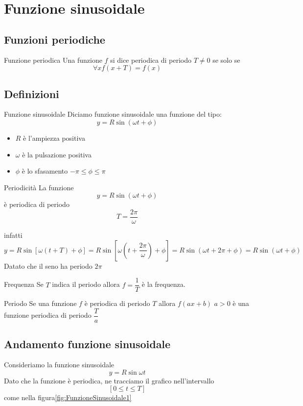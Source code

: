 \chapter{Funzione sinusoidale}
\label{cha:FunzioneSinusoidale}
\section{Funzioni periodiche}
\begin{definizionet}{Funzione periodica}{}
Una funzione $f$ si dice periodica di periodo $T\neq0$ se solo se \[\forall x f(x+T)=f(x)\]
\end{definizionet}
\section{Definizioni}

\begin{definizionet}{Funzione sinusoidale}{}
	Diciamo funzione sinusoidale una funzione del tipo:
	\[ y=R\sin(\omega t+\phi)\]
	\begin{itemize}
		\item $R$ è l'ampiezza positiva
		\item $\omega$ è la pulsazione positiva
		\item $\phi$ è lo sfasamento $-\pi\leq\phi\leq\pi$
	\end{itemize}
\end{definizionet}
\begin{osservazionet}{Periodicità}{}
	La funzione\[ y=R\sin(\omega t+\phi)\]è periodica di periodo\[T=\dfrac{2\pi}{\omega}\]
\end{osservazionet}
infatti\[ y=R\sin[\omega(t+T)+\phi]=R\sin[\omega(t+\dfrac{2\pi}{\omega})+\phi]=R\sin(\omega
t+2\pi+\phi)=R\sin(\omega
t+\phi)\]
Datato che il seno ha periodo $2\pi$
\begin{definizionet}{Frequenza}{}
	Se $T$ indica il periodo allora  $f=\dfrac{1}{T}$ è la frequenza.
\end{definizionet}
\begin{teoremat}{Periodo}{}
	Se una funzione $f$ è periodica di periodo $T$ allora $f(ax+b)$ $a>0$ è una funzione periodica di periodo $\dfrac{T}{a}$
\end{teoremat}
\section{Andamento funzione sinusoidale}
Consideriamo la funzione sinusoidale\[y=R\sin\omega t\] Dato che la funzione è periodica, ne tracciamo il grafico nell'intervallo \[[0\leq t\leq T]\] come nella figura\nobs\vref{fig:FunzioneSinusoidale1}

